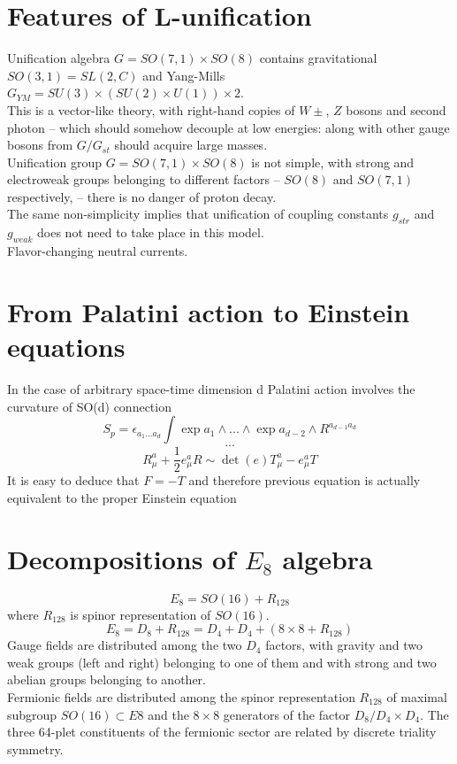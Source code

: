 \documentclass{article}
\begin{document}
\section{Features of L-unification}
Unification algebra $G = SO(7, 1) \times SO(8)$ contains gravitational $SO(3, 1) = SL(2, C)$ and Yang-Mills $G_{YM} = SU (3) × (SU (2) \times U (1)) \times 2$. \\
This is a vector-like theory, with right-hand copies of $W±$, $Z$ bosons and second photon – which should somehow decouple at low energies: along with other gauge bosons from $G/G_{st}$ should acquire large masses. \\
Unification group $G = SO(7, 1) \times SO(8)$ is not simple, with strong and electroweak groups belonging to different factors – $SO(8)$ and $SO(7, 1)$ respectively, – there is no danger of proton decay. \\
The same non-simplicity implies that unification of coupling constants $g_{str}$ and $g_{weak}$ does not need to take place in this model. \\
Flavor-changing neutral currents. \\

\section{From Palatini action to Einstein equations}
In the case of arbitrary space-time dimension d Palatini action involves the curvature of SO(d) connection
\begin{equation}
    S_p = \epsilon_{a_1 ... a_d} \int \exp{a_1} \land ... \land \exp{a_{d-2}} \land R^{a_{d-1}a_d}
\end{equation}
\begin{equation}
    ...
\end{equation}
\begin{equation}
    R_\mu^a + \frac{1}{2}e_\mu^a R \sim \det(e)T_\mu^a - e^a_\mu T
\end{equation}
It is easy to deduce that $F = -T$ and therefore previous equation is actually equivalent to the proper Einstein equation

\newpage
\section{Decompositions of $E_8$ algebra}
\begin{equation}
    E_8 = SO(16) + R_{128}
\end{equation}
where $R_{128}$ is spinor representation of $SO(16)$.
\begin{equation}
    E_8 = D_8 + R_{128} = D_4 + D_4 + (8 \times 8 + R_{128})
\end{equation}
Gauge fields are distributed among the two $D_4$ factors, with gravity and two weak groups (left and right) belonging to one of them and with strong and two abelian groups belonging to another. \\
Fermionic fields are distributed among the spinor representation $R_128$ of maximal subgroup $SO(16) \subset E8$ and the $8 \times 8$ generators of the factor $D_8/D_4 \times D_4$. The three 64-plet constituents of the fermionic sector are related by discrete triality symmetry. \\
\end{document}
